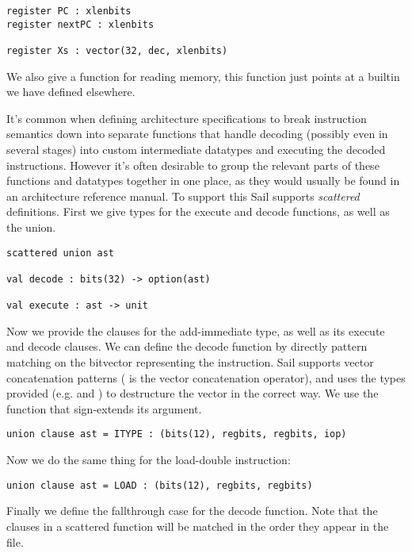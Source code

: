 \begin{lstlisting}
register PC : xlenbits
register nextPC : xlenbits

register Xs : vector(32, dec, xlenbits)
\end{lstlisting}



We also give a function  for reading memory, this function
just points at a builtin we have defined elsewhere.


It's common when defining architecture specifications to break
instruction semantics down into separate functions that handle
decoding (possibly even in several stages) into custom intermediate
datatypes and executing the decoded instructions. However it's often
desirable to group the relevant parts of these functions and datatypes
together in one place, as they would usually be found in an
architecture reference manual. To support this Sail supports
\emph{scattered} definitions. First we give types for the execute and
decode functions, as well as the  union.


\begin{lstlisting}
scattered union ast

val decode : bits(32) -> option(ast)

val execute : ast -> unit
\end{lstlisting}

Now we provide the clauses for the add-immediate  type, as
well as its execute and decode clauses. We can define the decode
function by directly pattern matching on the bitvector representing
the instruction. Sail supports vector concatenation patterns (
is the vector concatenation operator), and uses the types provided
(e.g.  and ) to destructure the vector in the
correct way. We use the  function that sign-extends
its argument.

\begin{lstlisting}
union clause ast = ITYPE : (bits(12), regbits, regbits, iop)
\end{lstlisting}

\sailfclITYPEdecode
\sailfclITYPEexecute

\noindent Now we do the same thing for the load-double instruction:

\begin{lstlisting}
union clause ast = LOAD : (bits(12), regbits, regbits)
\end{lstlisting}

\sailfclLOADdecode
\sailfclLOADexecute

\noindent Finally we define the fallthrough case for the decode function. Note
that the clauses in a scattered function will be matched in the order
they appear in the file.
